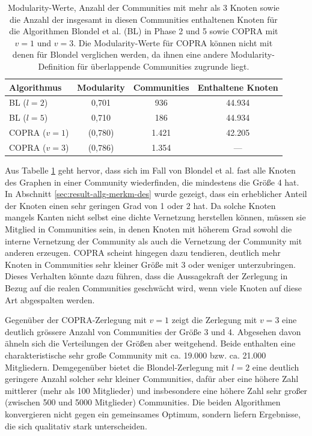 \begin{table}[t]
  \centering
  \footnotesize
  \begin{tabular}{l|c|c|c}
    Algorithmus & Modularity & Communities &
    Enthaltene Knoten \\
    \hline
    BL ($l=2$)& 0,701 & 936 & 44.934 \\
    BL ($l=5$)& 0,710 & 186 & 44.934 \\
    \hline
    COPRA ($v=1$) & (0,780) & 1.421 & 42.205 \\
    COPRA ($v=3$) & (0,786) & 1.354 & --- \\

  \end{tabular}
  \caption{Modularity-Werte, Anzahl der Communities mit mehr als 3
    Knoten sowie die Anzahl der insgesamt in diesen Communities enthaltenen
    Knoten 
    für die Algorithmen 
    Blondel et al. (BL) in Phase 2 und 5 sowie COPRA mit $v=1$ und
    $v=3$. Die
    Modularity-Werte für COPRA können nicht mit denen für
    Blondel verglichen werden, da ihnen eine andere
    Modularity-Definition für überlappende Communities zugrunde
    liegt.}
  \label{tab:mod-result}
\end{table}

Aus Tabelle \ref{tab:mod-result} geht hervor, dass sich im Fall von
Blondel et al. fast alle Knoten des Graphen in einer Community
wiederfinden, die mindestens die Größe 4 hat. In Abschnitt
\ref{sec:result-allg-merkm-des} wurde gezeigt, dass ein erheblicher
Anteil der Knoten einen sehr geringen Grad von 1 oder 2 hat. Da solche
Knoten mangels Kanten nicht selbst eine dichte Vernetzung herstellen
können, müssen sie Mitglied in Communities sein, in denen Knoten
mit höherem Grad sowohl die interne Vernetzung der Community als
auch die Vernetzung der Community mit anderen erzeugen. COPRA scheint
hingegen dazu tendieren, deutlich mehr Knoten in Communities sehr
kleiner Größe mit 3 oder weniger unterzubringen. Dieses Verhalten
könnte dazu führen, dass die Aussagekraft der Zerlegung in Bezug
auf die realen Communities geschwächt wird, wenn viele Knoten auf
diese Art abgespalten werden.

Gegenüber der COPRA-Zerlegung mit $v=1$ zeigt die Zerlegung mit
$v=3$ eine deutlich grössere Anzahl von Communities der Größe 3
und 4. Abgesehen davon ähneln sich die Verteilungen der Größen aber
weitgehend. Beide enthalten eine charakteristische sehr gro{\ss}e
Community mit ca. 19.000 bzw. ca. 21.000 Mitgliedern. Demgegenüber
bietet die Blondel-Zerlegung mit $l=2$ eine deutlich geringere Anzahl
solcher sehr kleiner Communities, dafür aber eine höhere Zahl
mittlerer (mehr als 100 Mitglieder) und insbesondere eine höhere
Zahl sehr großer (zwischen 500 und 5000 Mitglieder) Communities.  Die
beiden Algorithmen konvergieren nicht gegen ein gemeinsames Optimum,
sondern liefern Ergebnisse, die sich qualitativ stark unterscheiden.

